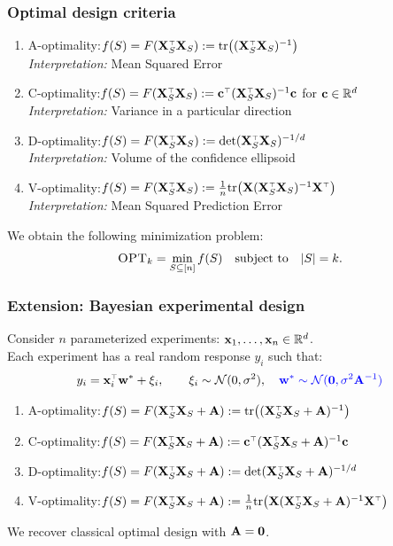 \documentclass[10pt]{beamer}
\begin{document}
\begin{frame}
  \frametitle{Optimal design criteria}
  \begin{enumerate}
  \item A-optimality:\quad $f(S) = F(\X_S^\top\X_S) := \tr\big((\X_S^\top\X_S)^{-1}\big)$\\
    {\footnotesize\textit{Interpretation:} Mean Squared Error}
    \pause
\item C-optimality:\quad $f(S) = F(\X_S^\top\X_S) := \cb^\top(\X_S^\top\X_S)^{-1}\cb$ for
  $\mathbf{c} \in \mathbb R^d$\\
    {\footnotesize  \textit{Interpretation:} Variance in a particular
      direction}
        \pause
\item D-optimality:\quad $f(S) = F(\X_S^\top\X_S) := \det(\X_S^\top\X_S)^{-1/d}$\\
    {\footnotesize  \textit{Interpretation:} Volume of the confidence
      ellipsoid}
        \pause
  \item V-optimality:\quad $f(S) = F(\X_S^\top\X_S) :=
    \frac1n\tr\big(\X(\X_S^\top\X_S)^{-1}\X^\top\big)$\\
    {\footnotesize    \textit{Interpretation:} Mean Squared Prediction Error}
  \end{enumerate}
\vspace{5mm}
  \pause
  
  We obtain the following minimization problem:
\begin{align*}
  {\textsc{OPT}_k}=\min_{S\subseteq[n]}f(S)\quad\text{subject to}\quad |S|=k.
\end{align*}
\end{frame}

\begin{frame}
  \frametitle{Extension: Bayesian experimental design}
    Consider $n$ parameterized experiments:
  $\mathbf x_1,\dots,\mathbf x_n\in\mathbb R^d$.\\
  Each experiment has a real random response $y_i$ such that:
  \begin{align*}
    y_i = \x_i^\top\w^* + \xi_i,\qquad \xi_i\sim\Nc(0,\sigma^2),\quad \Blue{\w^*\sim\Nc(\zero,\sigma^2\A^{-1})}
  \end{align*}
\pause
    \begin{enumerate}
  \item A-optimality:\quad $f(S) = F(\X_S^\top\X_S+\A) := \tr\big((\X_S^\top\X_S+\A)^{-1}\big)$
\item C-optimality:\quad $f(S)= F(\X_S^\top\X_S+\A) := \cb^\top(\X_S^\top\X_S+\A)^{-1}\cb$ 
\item D-optimality:\quad $f(S) = F(\X_S^\top\X_S+\A) := \det(\X_S^\top\X_S+\A)^{-1/d}$
  \item V-optimality:\quad $f(S) = F(\X_S^\top\X_S+\A) :=
    \frac1n\tr\big(\X(\X_S^\top\X_S+\A)^{-1}\X^\top\big)$\\
  \end{enumerate}
  \pause
  \vspace{5mm}
  
  We recover classical optimal design with $\mathbf A=\mathbf 0$.  
\end{frame}
\end{document}
